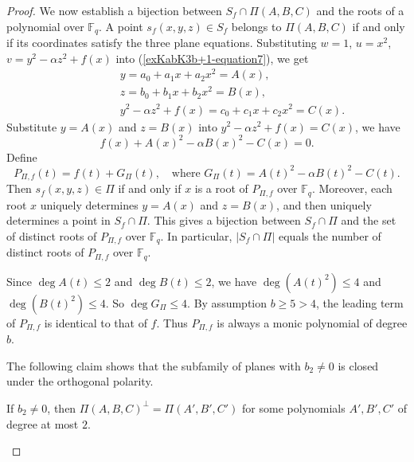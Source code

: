 \documentclass[10pt,a4paper]{amsart}
\begin{document}
\begin{proof}
We now establish a bijection between $S_f \cap \Pi(A,B,C)$ and the roots of a polynomial over $\mathbb{F}_q$. A point $s_f(x,y,z) \in S_f$ belongs to $\Pi(A,B,C)$ if and only if its coordinates satisfy the three plane equations. Substituting $w=1$, $u=x^2$, $v = y^2 - \alpha z^2 + f(x)$ into (\ref{exKabK3b+1-equation7}), we get
\[
\begin{aligned}
~~~~~~~~~~~~~~~~~&y = a_0 + a_1 x + a_2 x^2 = A(x), \\
&z= b_0 + b_1 x + b_2 x^2 = B(x), \\
&y^2 - \alpha z^2 + f(x) = c_0 + c_1 x + c_2 x^2 = C(x).
\end{aligned}
\]
Substitute $y = A(x)$ and $z = B(x)$ into $y^2 - \alpha z^2 + f(x) = C(x)$, we have
\[
f(x) + A(x)^2 - \alpha B(x)^2 - C(x) = 0.
\]
Define %
\[
P_{\Pi,f}(t) = f(t) + G_\Pi(t), \quad \text{where } G_\Pi(t) = A(t)^2 - \alpha B(t)^2 - C(t).
\]
Then $s_f(x,y,z) \in \Pi$ if and only if $x$ is a root of $P_{\Pi,f}$ over $\mathbb{F}_q$. Moreover, each root $x$ uniquely determines $y=A(x)$ and $z=B(x)$, and then uniquely determines a point in $S_f \cap \Pi$. This gives a bijection between $S_f \cap \Pi$ and the set of distinct roots of $P_{\Pi,f}$ over $\mathbb{F}_q$. In particular, $|S_f \cap \Pi|$ equals the number of distinct roots of $P_{\Pi,f}$ over $\mathbb{F}_q$.

Since $\deg A(t) \leq 2$ and $\deg B(t) \leq 2$, we have $\deg(A(t)^2) \leq 4$ and $\deg(B(t)^2) \leq 4$. So $\deg G_\Pi \leq 4$. By assumption $b \geq 5 > 4$,  the leading term of $P_{\Pi,f}$ is identical to that of $f$. Thus $P_{\Pi,f}$ is always a monic polynomial of degree $b$.



The following claim shows that the subfamily of planes with $b_2 \neq 0$ is closed under the orthogonal polarity.

\begin{claim}\label{clm:polar-closure}
If $b_2 \neq 0$, then $\Pi(A,B,C)^\perp = \Pi(A',B',C')$ for some  polynomials $A',B',C'$ of degree at most $2$.
\end{claim}


\end{proof}
\end{document}

